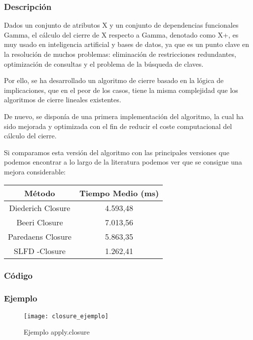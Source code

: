 \subsubsection{Descripci\'on} 
Dados un conjunto de atributos X y un conjunto de dependencias funcionales Gamma, el c\'alculo del cierre de X respecto a Gamma, denotado como X+, es muy usado en inteligencia artificial y bases de datos, ya que es un punto clave en la resoluci\'on de muchos problemas: eliminaci\'on de restricciones redundantes, optimizaci\'on de consultas y el problema de la b\'usqueda de claves.

Por ello, se ha desarrollado un algoritmo de cierre basado en la l\'ogica de implicaciones, que en el peor de los casos, tiene la misma complejidad que los algoritmos de cierre lineales existentes.

De nuevo, se dispon\'ia de una primera implementaci\'on del algoritmo, la cual ha sido mejorada y optimizada con el fin de reducir el coste computacional del c\'alculo del cierre.

Si comparamos esta versi\'on del algoritmo con las principales versiones que podemos encontrar a lo largo de la literatura podemos ver que se consigue una mejora considerable:

\begin{center}
    \begin{tabular}{c c}
        \hline
        M\'etodo & Tiempo Medio (ms) \\
        \hline
        Diederich Closure & 4.593,48 \\   
        Beeri Closure & 7.013,56 \\   
        Paredaens Closure & 5.863,35 \\  
        SLFD -Closure & 1.262,41 \\  
    \end{tabular}
\end{center}
\newpage
\subsubsection{C\'odigo} 

\subsubsection{Ejemplo} 
\begin{figure}[h]
    \centering
    \texttt{[image: closure\_ejemplo]}
    \caption{Ejemplo apply.closure}
    \label{fig:closure_ejemplo}
\end{figure} 

